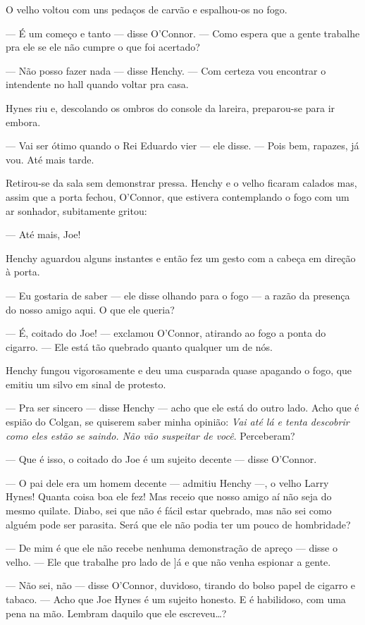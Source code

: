 O velho voltou com uns pedaços de carvão e espalhou-os no fogo.

--- É um começo e tanto --- disse O'Connor. --- Como espera que a
gente trabalhe pra ele se ele não cumpre o que foi acertado?

--- Não posso fazer nada --- disse Henchy. --- Com certeza vou
encontrar o intendente no hall quando voltar pra casa.

Hynes riu e, descolando os ombros do console da lareira, preparou-se
para ir embora.

--- Vai ser ótimo quando o Rei Eduardo vier --- ele disse. --- Pois
bem, rapazes, já vou. Até mais tarde.

Retirou-se da sala sem demonstrar pressa. Henchy e o velho ficaram
calados mas, assim que a porta fechou, O'Connor, que estivera
contemplando o fogo com um ar sonhador, subitamente gritou:

--- Até mais, Joe!

Henchy aguardou alguns instantes e então fez um gesto com a cabeça
em direção à porta.

--- Eu gostaria de saber --- ele disse olhando para o fogo --- a razão
da presença do nosso amigo aqui. O que ele queria?

--- É, coitado do Joe! --- exclamou O'Connor, atirando ao fogo a ponta
do cigarro. --- Ele está tão quebrado quanto qualquer um de nós.

Henchy fungou vigorosamente e deu uma cusparada quase apagando o fogo,
que emitiu um silvo em sinal de protesto.

--- Pra ser sincero --- disse Henchy --- acho que ele está do outro
lado. Acho que é espião do Colgan, se quiserem saber minha opinião:
\textit{Vai até lá e tenta descobrir como eles estão se saindo. Não vão
suspeitar de você}. Perceberam?

--- Que é isso, o coitado do Joe é um sujeito decente --- disse
O'Connor.

--- O pai dele era um homem decente --- admitiu Henchy ---, o velho
Larry Hynes! Quanta coisa boa ele fez! Mas receio que nosso amigo aí
não seja do mesmo quilate. Diabo, sei que não é fácil estar quebrado,
mas não sei como alguém pode ser parasita. Será que ele não podia ter
um pouco de hombridade?

--- De mim é que ele não recebe nenhuma demonstração de apreço ---
disse o velho. --- Ele que trabalhe pro lado de ]á e que não venha
espionar a gente.

--- Não sei, não --- disse O'Connor, duvidoso, tirando do bolso papel
de cigarro e tabaco. --- Acho que Joe Hynes é um sujeito honesto. E é
habilidoso, com uma pena na mão. Lembram daquilo que ele escreveu\ldots{}?

